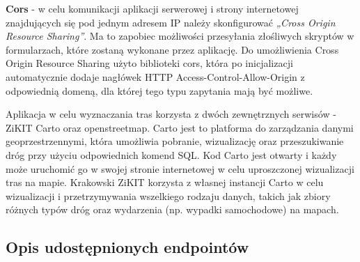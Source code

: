 \textbf{Cors} - w celu komunikacji aplikacji serwerowej i strony internetowej znajdujących się pod jednym adresem IP należy skonfigurować \textit{„Cross Origin Resource Sharing”}. Ma to zapobiec możliwości przesyłania złośliwych skryptów w formularzach, które zostaną wykonane przez aplikację. Do umożliwienia Cross Origin Resource Sharing użyto biblioteki cors, która po inicjalizacji automatycznie dodaje nagłówek HTTP Access-Control-Allow-Origin z odpowiednią domeną, dla której tego typu zapytania mają być możliwe.\newline

Aplikacja w celu wyznaczania tras korzysta z dwóch zewnętrznych serwisów - ZiKIT Carto oraz openstreetmap. Carto jest to platforma do zarządzania danymi geoprzestrzennymi, która umożliwia pobranie, wizualizację oraz przeszukiwanie dróg przy użyciu odpowiednich komend SQL. Kod Carto jest otwarty i każdy może uruchomić go w swojej stronie internetowej w celu uproszczonej wizualizacji tras na mapie. Krakowski ZiKIT korzysta z własnej instancji Carto w celu wizualizacji i przetrzymywania wszelkiego rodzaju danych, takich jak zbiory różnych typów dróg oraz wydarzenia (np. wypadki samochodowe) na mapach.\newline 

\subsection{Opis udostępnionych endpointów}

